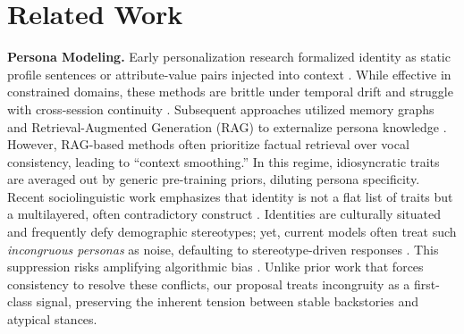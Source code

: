 \section{Related Work}\label{sec:work}

\par\noindent \textbf{Persona Modeling.}
Early personalization research formalized identity as static profile sentences \citep{zhang2018personachat} or attribute-value pairs injected into context \citep{personaRAG}. While effective in constrained domains, these methods are brittle under temporal drift and struggle with cross-session continuity \citep{personaRAG}. Subsequent approaches utilized memory graphs and Retrieval-Augmented Generation (RAG) to externalize persona knowledge \citep{crafting-2024}. However, RAG-based methods often prioritize factual retrieval over vocal consistency, leading to ``context smoothing.'' In this regime, idiosyncratic traits are averaged out by generic pre-training priors, diluting persona specificity. 
Recent sociolinguistic work emphasizes that identity is not a flat list of traits but a multilayered, often contradictory construct \citep{DevGTDP23,DavaniDBP24}. Identities are culturally situated and frequently defy demographic stereotypes; yet, current models often treat such \textit{incongruous personas} as noise, defaulting to stereotype-driven responses \citep{wan2023are,fan-etal-2024-biasalert,cao-etal-2025-multilingual}. This suppression risks amplifying algorithmic bias \citep{lin-etal-2023-counterfactual,tu-etal-2023-training}. Unlike prior work that forces consistency to resolve these conflicts, our proposal treats incongruity as a first-class signal, preserving the inherent tension between stable backstories and atypical stances.





